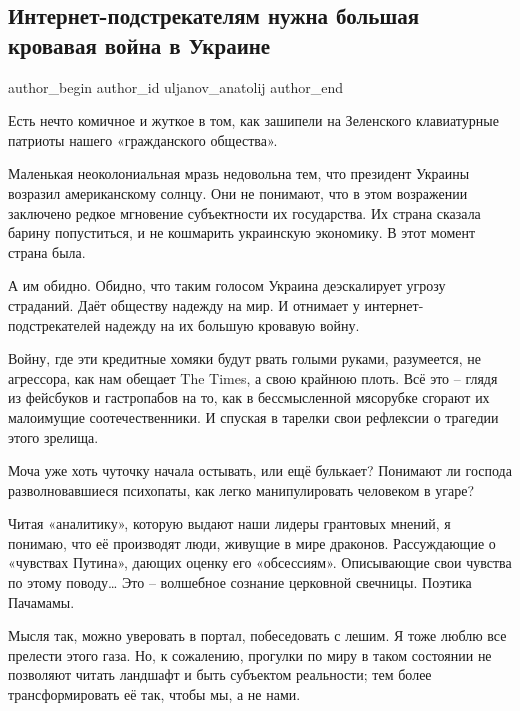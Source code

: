  
 
 
 
 
 
\subsection{Интернет-подстрекателям нужна большая кровавая война в Украине}
\label{sec:31_01_2022.fb.uljanov_anatolij.1.internet_podsrekateli}
 
\ifcmt
 author_begin
   author_id uljanov_anatolij
 author_end
\fi

Есть нечто комичное и жуткое в том, как зашипели на Зеленского клавиатурные
патриоты нашего «гражданского общества». 

Маленькая неоколониальная мразь недовольна тем, что президент Украины возразил
американскому солнцу. Они не понимают, что в этом возражении заключено редкое
мгновение субъектности их государства. Их страна сказала барину попуститься, и
не кошмарить украинскую экономику. В этот момент страна была. 


А им обидно. Обидно, что таким голосом Украина деэскалирует угрозу страданий.
Даёт обществу надежду на мир. И отнимает у интернет-подстрекателей надежду на
их большую кровавую войну. 

Войну, где эти кредитные хомяки будут рвать голыми руками, разумеется, не
агрессора, как нам обещает The Times, а свою крайнюю плоть. Всё это – глядя из
фейсбуков и гастропабов на то, как в бессмысленной мясорубке сгорают их
малоимущие соотечественники. И спуская в тарелки свои рефлексии о трагедии
этого зрелища.

Моча уже хоть чуточку начала остывать, или ещё булькает? Понимают ли господа
разволновавшиеся психопаты, как легко манипулировать человеком в угаре? 

Читая «аналитику», которую выдают наши лидеры грантовых мнений, я понимаю, что
её производят люди, живущие в мире драконов. Рассуждающие о «чувствах Путина»,
дающих оценку его «обсессиям». Описывающие свои чувства по этому поводу… Это –
волшебное сознание церковной свечницы. Поэтика Пачамамы.

Мысля так, можно уверовать в портал, побеседовать с лешим. Я тоже люблю все
прелести этого газа. Но, к сожалению, прогулки по миру в таком состоянии не
позволяют читать ландшафт и быть субъектом реальности; тем более
трансформировать её так, чтобы мы, а не нами.

